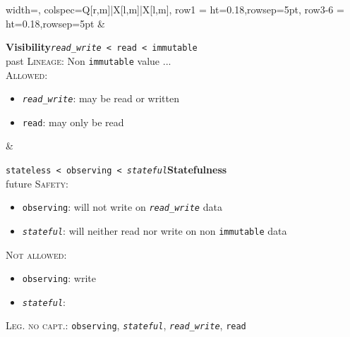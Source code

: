 \documentclass{article}
\begin{document}
\begin{center}
\begin{tblr}{
  width=\textwidth, %
  colspec={Q[r,m]|X[l,m]|X[l,m]},
  row{1}   = {ht=0.18\textheight,rowsep=5pt},
  row{3-6} = {ht=0.18\textheight,rowsep=5pt}
}
& {
\begin{minipage}[c][0.18\textheight][s]{\linewidth}
  {\large\bfseries Visibility}\hfill{\small\texttt{\textit{read\_write} < read < immutable}}\\
  {\footnotesize past}
  \vfill
  \textsc{Lineage}: Non \texttt{immutable} value ... \\
  \textsc{Allowed}:
  \begin{itemize}
    \item\texttt{\textit{read\_write}}: may be read or written
    \item\texttt{read}: may only be read
  \end{itemize}
\end{minipage}
} & {
\begin{minipage}[c][0.18\textheight][s]{\linewidth}
  {\small\texttt{stateless < observing < \textit{stateful}}}\hfill{\large\bfseries Statefulness}\\
  {\footnotesize\null\hfill future}
  \vfill
  \textsc{Safety}:
  \begin{itemize}
    \item\texttt{observing}: will not write on \texttt{\textit{read\_write}} data
    \item\texttt{\textit{stateful}}: will neither read nor write on non \texttt{immutable} data
  \end{itemize}
  \textsc{Not allowed}:
  \begin{itemize}
    \item\texttt{observing}: write
    \item\texttt{\textit{stateful}}: 
  \end{itemize}
  \textsc{Leg. no capt.}: \texttt{observing}, \texttt{\textit{stateful}}, \texttt{\textit{read\_write}}, \texttt{read} \\
\end{minipage}
}

\end{tblr}
\end{center} %
\end{document}

